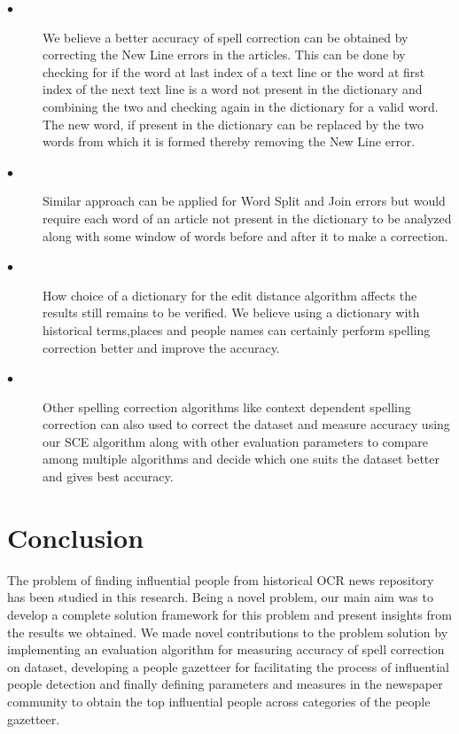 \documentclass[letterpaper,11pt]{report}
\begin{document}
\begin{description}
\item[$\bullet$]\noindent
We believe a better accuracy of spell correction can be obtained by correcting the New Line errors in the articles. This can be done by checking for if the word at last index of a text line or the word at first index of the next text line is a word not present in the dictionary and combining the two and checking again in the dictionary for a valid word. The new word, if present in the dictionary can be replaced by the two words from which it is formed thereby removing the New Line error. 
\item[$\bullet$]\noindent Similar approach can be applied for Word Split and Join errors but would require each word of an article not present in the dictionary to be analyzed along with some window of words before and after it to make a correction. 
\item[$\bullet$]\noindent How choice of a dictionary for the edit distance algorithm affects the results still remains to be verified. We believe using a dictionary with historical terms,places and people names can certainly perform spelling correction better and improve the accuracy.
\item[$\bullet$] \noindent Other spelling correction algorithms like context dependent spelling correction can also used to correct the dataset and measure accuracy using our SCE algorithm along with other evaluation parameters to compare among multiple algorithms and decide which one suits the dataset better and gives best accuracy. 
\end{description}



 

 




\chapter{Conclusion}
\label{chapter:conclusion}

The problem of finding influential people from historical OCR news repository has been studied in this research. Being a novel problem, our main aim was to develop a complete solution framework for this problem and present insights from the results we obtained.
 We made novel contributions to the problem solution by implementing an evaluation algorithm for measuring accuracy of spell correction on dataset, developing a people gazetteer for facilitating the process of influential people detection and finally defining parameters and measures in the newspaper community to obtain the top influential people across categories of the people gazetteer.
  
\end{document}
